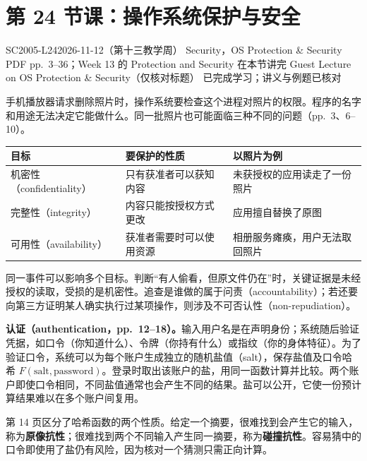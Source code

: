 \begingroup
\renewcommand{\recordid}[1]{}
\renewcommand{\relatedexercise}[2]{\hyperref[exercise:#1]{#2}}
\section{第 24 节课：操作系统保护与安全}
\label{lecture:SC2005-L24}
\lecturemeta
  {SC2005-L24}{2026-11-12（第十三教学周）}
  {Security，OS Protection \& Security}
  {PDF pp.~3--36；Week 13 的 Protection and Security 在本节讲完}
  {Guest Lecture on OS Protection \& Security（仅核对标题）}
  {已完成学习；讲义与例题已核对}

\linespread{1.1}\selectfont
\setlength{\parskip}{0.3em}

手机播放器请求删除照片时，操作系统要检查这个进程对照片的权限。程序的名字和用途无法决定它能做什么。同一批照片也可能面临三种不同的问题（pp.~3、6--10）。

\begin{center}
\small
\begin{tabularx}{\linewidth}{@{}lXX@{}}
\toprule
目标 & 要保护的性质 & 以照片为例 \\
\midrule
机密性（confidentiality） & 只有获准者可以获知内容 & 未获授权的应用读走了一份照片 \\
完整性（integrity） & 内容只能按授权方式更改 & 应用擅自替换了原图 \\
可用性（availability） & 获准者需要时可以使用资源 & 相册服务瘫痪，用户无法取回照片 \\
\bottomrule
\end{tabularx}
\end{center}
同一事件可以影响多个目标。判断“有人偷看，但原文件仍在”时，关键证据是未经授权的读取，受损的是机密性。追查是谁做的属于问责（accountability）；若还要向第三方证明某人确实执行过某项操作，则涉及不可否认性（non-repudiation）。

\textbf{认证（authentication，pp.~12--18）。}输入用户名是在声明身份；系统随后验证凭据，如口令（你知道什么）、令牌（你持有什么）或指纹（你的身体特征）。为了验证口令，系统可以为每个账户生成独立的随机盐值（salt），保存盐值及口令哈希 $F(\mathrm{salt},\mathrm{password})$。登录时取出该账户的盐，用同一函数计算并比较。两个账户即使口令相同，不同盐值通常也会产生不同的结果。盐可以公开，它使一份预计算结果难以在多个账户间复用。

第 14 页区分了哈希函数的两个性质。给定一个摘要，很难找到会产生它的输入，称为\textbf{原像抗性}；很难找到两个不同输入产生同一摘要，称为\textbf{碰撞抗性}。容易猜中的口令即使用了盐仍有风险，因为核对一个猜测只需正向计算。

